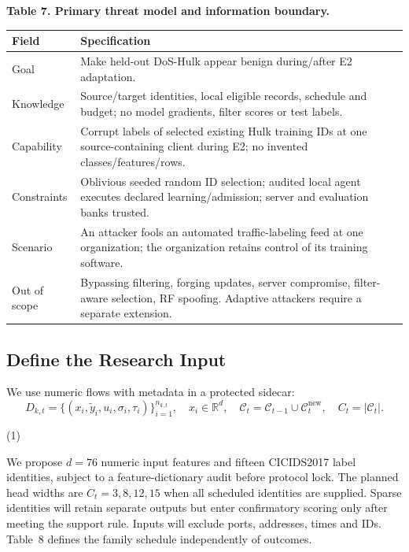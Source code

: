 \documentclass[10pt,a4paper]{article}
\begin{document}
\centering\footnotesize
\par\textbf{Table 7. Primary threat model and information boundary.}\par


\begin{longtable}{p{2.0cm}l}
\toprule
Field & Specification\\
\midrule
Goal & Make held-out DoS-Hulk appear benign during/after E2 adaptation.\\
Knowledge & Source/target identities, local eligible records, schedule and budget; no model gradients, filter scores or test labels.\\
Capability & Corrupt labels of selected existing Hulk training IDs at one source-containing client during E2; no invented classes/features/rows.\\
Constraints & Oblivious seeded random ID selection; audited local agent executes declared learning/admission; server and evaluation banks trusted.\\
Scenario & An attacker fools an automated traffic-labeling feed at one organization; the organization retains control of its training software.\\
Out of scope & Bypassing filtering, forging updates, server compromise, filter-aware selection, RF spoofing. Adaptive attackers require a separate extension.\\
\bottomrule
\end{longtable}


\subsection{Define the Research Input}
We use numeric flows with metadata in a protected sidecar:
\begin{equation}
D_{k,t}=\{(x_i,\widetilde y_i,u_i,\sigma_i,\tau_i)\}_{i=1}^{n_{k,t}},\quad
x_i\in\mathbb R^d,\quad\mathcal C_t=\mathcal C_{t-1}\cup\mathcal C_t^{\mathrm{new}},\quad C_t=|\mathcal C_t|.

\end{equation}
\par\hfill(1)\par

We propose $d=76$ numeric input features and fifteen CICIDS2017 label identities, subject to a feature-dictionary audit before protocol lock. The planned head widths are $C_t=3,8,12,15$ when all scheduled identities are supplied. Sparse identities will retain separate outputs but enter confirmatory scoring only after meeting the support rule. Inputs will exclude ports, addresses, times and IDs. Table~8 defines the family schedule independently of outcomes.
\end{document}
